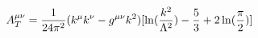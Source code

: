 \begin{equation}
A^{\mu\nu}_T ={1\over {24\pi^2}} (k^\mu k^\nu -
g^{\mu\nu}k^2)[\ln ({{k^2}\over{\Lambda^2}}) - \frac{5}{3} + 2
\ln ({\pi \over 2})]
\end{equation}

